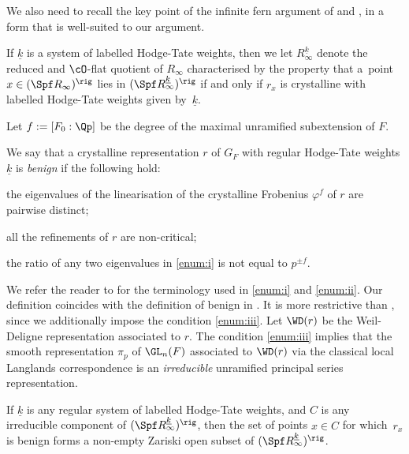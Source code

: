 We also need to recall the key point of the infinite fern argument
of \cite{Chenevier} and \cite{Nakamura}, in a form that
is well-suited to our argument.

\begin{defi} If $\underline{k}$ is a system of
labelled Hodge-Tate weights,
then we let $R^{\underline{k}}_{\infty}$ denote the reduced and $\cO$-flat
quotient of $R_{\infty}$ characterised by the property that a~point $x \in (\Spf R_{\infty})^{\rig}$ lies in
$(\Spf R^{\underline{k}}_{\infty})^{\rig}$ if and only if
$r_x$ is crystalline with labelled Hodge-Tate weights given
by~$\underline{k}$.
\end{defi}

Let $f:=[F_0: \Qp]$ be the degree of the maximal unramified subextension of $F$.
\begin{defi}\label{defi:benign}
We say that a crystalline representation $r$ of $G_F$ with regular Hodge-Tate weights $\underline{k}$
is \textit{benign} if the following hold:
\begin{enumeratei}
\item\label{enum:i}
the eigenvalues of the linearisation of the crystalline Frobenius $\varphi^f$ of $r$ are pairwise distinct;
\item\label{enum:ii}
all the refinements of $r$ are non-critical;
\item\label{enum:iii}
the ratio of any two eigenvalues in \eqref{enum:i} is not equal to $p^{\pm f}$.
\end{enumeratei}
\end{defi}
We refer the reader to \cite[\S 2.3]{BHS} for the terminology used in \eqref{enum:i} and \eqref{enum:ii}. Our definition coincides
with the definition of benign in \cite[Def.\,2.8]{Nakamura}. It is more restrictive than \hbox{\cite[Def.\,2.8]{BHS}},
since we additionally impose the condition \eqref{enum:iii}. Let $\WD(r)$ be the Weil-Deligne representation associated to $r$. The
condition \eqref{enum:iii} implies that the smooth representation $\pi_p$ of $\GL_n(F)$ associated to $\WD(r)$ via the classical local
Langlands correspondence is an \textit{irreducible} unramified principal series representation.

\begin{prop}
\label{prop:benign}
If $\underline{k}$ is any regular system of labelled Hodge-Tate weights,
and $C$ is any irreducible component of
$(\Spf R_{\infty}^{\underline{k}})^{\rig}$,
then the set of points $x \in C$ for which~$r_x$ is benign
forms a non-empty Zariski open subset
of $(\Spf R_{\infty}^{\underline{k}})^{\rig}$.
\end{prop}

